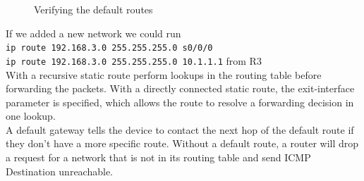 \documentclass[../EngineeringJournal_CDavis.tex]{subfiles}
\begin{document}
\begin{figure}[!hbt]\centering
{}\hfill
{}\par 
\caption{Verifying the default routes}\label{verify6}
\end{figure}

\clearpage


If we added a new network we could run\\
{\scriptsize{\verb$ip route 192.168.3.0 255.255.255.0 s0/0/0$}\normalsize}\\
{\scriptsize{\verb$ip route 192.168.3.0 255.255.255.0 10.1.1.1$}\normalsize}
from R3\\
With a recursive static route perform lookups in the routing table before forwarding
the packets. With a directly connected static route, the exit-interface  parameter is
specified, which allows the route to resolve a forwarding decision in one
lookup.\\
A default gateway tells the device to contact the next hop of the default route if
they don't have a more specific route. Without a default route, a router will drop a
request for a network that is not in its routing table and send ICMP Destination
unreachable.



\end{document}
